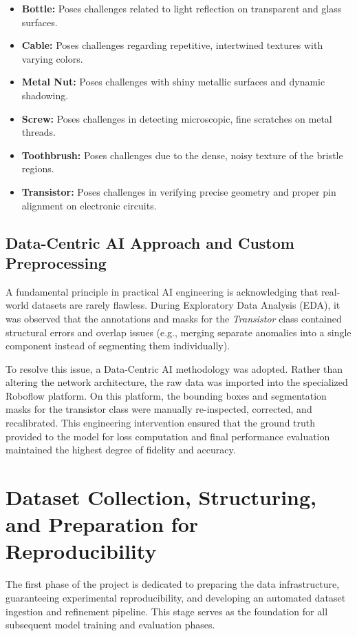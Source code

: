 \documentclass{article}
\begin{document}
\begin{itemize}
	\item \textbf{Bottle:} Poses challenges related to light reflection on transparent and glass surfaces.
	\item \textbf{Cable:} Poses challenges regarding repetitive, intertwined textures with varying colors.
	\item \textbf{Metal Nut:} Poses challenges with shiny metallic surfaces and dynamic shadowing.
	\item \textbf{Screw:} Poses challenges in detecting microscopic, fine scratches on metal threads.
	\item \textbf{Toothbrush:} Poses challenges due to the dense, noisy texture of the bristle regions.
	\item \textbf{Transistor:} Poses challenges in verifying precise geometry and proper pin alignment on electronic circuits.
\end{itemize}

\subsection*{Data-Centric AI Approach and Custom Preprocessing}
A fundamental principle in practical AI engineering is acknowledging that real-world datasets are rarely flawless. During Exploratory Data Analysis (EDA), it was observed that the annotations and masks for the \textit{Transistor} class contained structural errors and overlap issues (e.g., merging separate anomalies into a single component instead of segmenting them individually).

To resolve this issue, a Data-Centric AI methodology was adopted. Rather than altering the network architecture, the raw data was imported into the specialized Roboflow platform. On this platform, the bounding boxes and segmentation masks for the transistor class were manually re-inspected, corrected, and recalibrated. This engineering intervention ensured that the ground truth provided to the model for loss computation and final performance evaluation maintained the highest degree of fidelity and accuracy.

\section{Dataset Collection, Structuring, and Preparation for Reproducibility}

The first phase of the project is dedicated to preparing the data infrastructure, guaranteeing experimental reproducibility, and developing an automated dataset ingestion and refinement pipeline. This stage serves as the foundation for all subsequent model training and evaluation phases.
\end{document}
